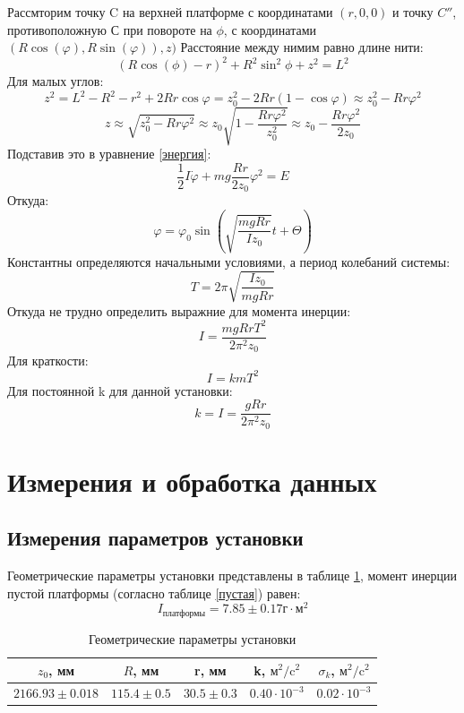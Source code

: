 \documentclass[a4paper,12pt]{article} %
\begin{document}
Рассмторим точку C на верхней платформе с координатами $(r, 0, 0)$ и точку $C''$, противоположную С при повороте на $\phi$, с координатами $(R\cos(\varphi), R\sin(\varphi)), z)$
Расстояние между нимим равно длине нити:
\begin{equation}
(R\cos(\phi)-r)^2+R^2\sin^2\phi+z^2=L^2
\end{equation}
Для малых углов:
\begin{equation}
z^2=L^2-R^2-r^2+2Rr\cos\varphi=z_0^2-2Rr(1-\cos\varphi)\approx z_0^2-Rr\varphi^2
\end{equation}
\begin{equation}
z \approx \sqrt{z_0^2-Rr\varphi^2}\approx z_0 \sqrt{1-\frac{Rr\varphi^2}{z_0^2}} \approx z_0- \frac{Rr\varphi^2}{2z_0}
\end{equation}
Подставив это в уравнение \ref{энергия}:
\begin{equation}
\frac{1}{2}I\dot{\varphi}+mg\frac{Rr}{2z_0}\varphi^2=E
\end{equation}
Откуда:
\begin{equation}
\varphi=\varphi_0\sin(\sqrt{\frac{mgRr}{Iz_0}}t+\Theta)
\end{equation}
Константны определяются начальными условиями, а период колебаний системы:
\begin{equation}
T=2\pi\sqrt{\frac{Iz_0}{mgRr}}
\end{equation}
Откуда не трудно определить выражние для момента инерции:
\begin{equation}
I=\frac{mgRrT^2}{2\pi^2z_0}
\end{equation}
Для краткости:
\begin{equation}
I=kmT^2
\end{equation}
Для постоянной k для данной установки:
\begin{equation}
k=I=\frac{gRr}{2\pi^2z_0}
\end{equation}

\section{Измерения и обработка данных}
\subsection{Измерения параметров установки}
Геометрические параметры установки представлены в таблице \ref{геом}, момент инерции пустой платформы (согласно таблице \ref{пустая}) равен:
\begin{equation}
I_{\text{платформы}} = 7.85 \pm 0.17 \text{г}\cdot \text{м}^2
\end{equation}
\begin{table} \label{геом} \caption{Геометрические параметры установки}
\begin{tabular}{|c|c|c|c|c|}
\hline 
$z_0$, мм& $R$, мм & r, мм & k, $\text{м}^2/\text{c}^2$ & $\sigma_k$, $\text{м}^2/\text{c}^2$ \\ 
\hline 
$2166.93 \pm 0.018$ & $115.4 \pm 0.5$ & $30.5 \pm 0.3$ & $0.40 \cdot 10^{-3}$ & $0.02 \cdot 10^{-3}$ \\ 
\hline 
\end{tabular} 
\end{table}
\end{document}
